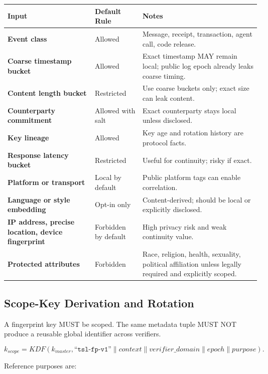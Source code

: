 \documentclass[11pt]{article}
\begin{document}
\begin{center}
\begin{tabularx}{\textwidth}{>{\bfseries}p{} p{} X}
\toprule
Input & Default Rule & Notes \\
\midrule
Event class & Allowed & Message, receipt, transaction, agent call, code release. \\
Coarse timestamp bucket & Allowed & Exact timestamp MAY remain local; public log epoch already leaks coarse timing. \\
Content length bucket & Restricted & Use coarse buckets only; exact size can leak content. \\
Counterparty commitment & Allowed with salt & Exact counterparty stays local unless disclosed. \\
Key lineage & Allowed & Key age and rotation history are protocol facts. \\
Response latency bucket & Restricted & Useful for continuity; risky if exact. \\
Platform or transport & Local by default & Public platform tags can enable correlation. \\
Language or style embedding & Opt-in only & Content-derived; should be local or explicitly disclosed. \\
IP address, precise location, device fingerprint & Forbidden by default & High privacy risk and weak continuity value. \\
Protected attributes & Forbidden & Race, religion, health, sexuality, political affiliation unless legally required and explicitly scoped. \\
\bottomrule
\end{tabularx}
\end{center}

\subsection{Scope-Key Derivation and Rotation}

A fingerprint key MUST be scoped. The same metadata tuple MUST NOT produce a reusable global identifier across verifiers.

\begin{equation}
k_{scope}=KDF(k_{master},\texttt{``tsl-fp-v1''}\parallel context\parallel verifier\_domain\parallel epoch\parallel purpose).
\end{equation}

Reference purposes are:
\end{document}
